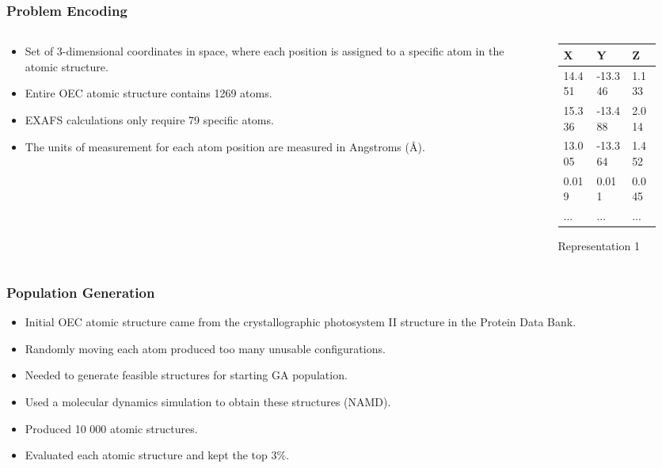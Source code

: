 \documentclass[10pt]{beamer}
\begin{document}
\begin{frame}
	\frametitle{Problem Encoding}

	\begin{columns}[T]
		\begin{column}{.5\textwidth}
			
			\begin{itemize}
				\item Set of 3-dimensional coordinates in space, where each position is assigned to a specific atom in the atomic structure.
				\item Entire OEC atomic structure contains 1269 atoms.
				\item EXAFS calculations only require 79 specific atoms.
				\item The units of measurement for each atom position are measured in Angstroms (\AA).
			\end{itemize}

		\end{column}
		\begin{column}{.5\textwidth}
			
			\begin{figure}
				\centering
				\begin{tabular}{ | l  l  l | }
					\hline
					X & Y & Z \\ \hline
					14.451 & -13.346 & 1.133 \\ \hline
					15.336 & -13.488 & 2.014 \\ \hline
					13.005 & -13.364 & 1.452 \\ \hline
					0.019 & 0.011 & 0.045 \\ \hline
					... & ... & ... \\ \hline
				\end{tabular}
				\caption{Representation 1}
			\end{figure}

		\end{column}
	\end{columns}
\end{frame}

\begin{frame}
	\frametitle{Population Generation}

	\begin{itemize}
		\item Initial OEC atomic structure came from the crystallographic photosystem II structure in the Protein Data Bank.
		\item Randomly moving each atom produced too many unusable configurations.
		\item Needed to generate feasible structures for starting GA population.
		\item Used a molecular dynamics simulation to obtain these structures (NAMD).
		\item Produced 10 000 atomic structures.
		\item Evaluated each atomic structure and kept the top 3\%.
	\end{itemize}
\end{frame}
\end{document}
